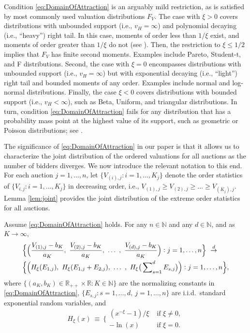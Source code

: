 Condition \eqref{eq:DomainOfAttraction} is an arguably mild restriction, as is satisfied by most commonly used valuation distributions $F_V$. The case with $\xi >0$ covers distributions with unbounded support (i.e., $v_H=\infty$) and polynomial decaying (i.e., ``heavy'') right tail. In this case, moments of order less than $1/\xi$ exist, and moments of order greater than $1/\xi$ do not (see \citet[page 176]{dehaan2006book}). Then, the restriction to $\xi \leq 1/2$ implies that $F_V$ has finite second moments. Examples include Pareto, Student-t, and F distributions. 
Second, the case with $\xi =0$ encompasses distributions with unbounded support (i.e., $v_H=\infty$) but with exponential decaying (i.e., ``light'') right tail and bounded moments of any order. Examples include normal and log-normal distributions. Finally, the case $\xi<0 $ covers distributions with bounded support (i.e., $v_H <\infty$), such as Beta, Uniform, and triangular distributions. In turn, condition \eqref{eq:DomainOfAttraction} fails for any distribution that has a probability mass point at the highest value of its support, such as geometric or Poisson distributions; see \citet[Exercise 1.13]{dehaan2006book}.

The significance of \eqref{eq:DomainOfAttraction} in our paper is that it allows us to characterize the joint distribution of the ordered valuations for all auctions as the number of bidders diverges. We now introduce the relevant notation to this end. For each auction $j=1,\dots,n$, let $\{V_{(i),j}:i=1,\dots,K_j\}$ denote the order statistics of $\{V_{i,j}:i=1,\dots,K_j\}$ in decreasing order, i.e., $V_{(1),j} \geq V_{(2),j}\geq \dots \geq V_{(K_j),j}$. Lemma \ref{lem:joint} provides the joint distribution of the extreme order statistics for all auctions.

\begin{lemma}\label{lem:joint}
Assume \eqref{eq:DomainOfAttraction} holds. For any $n \in \mathbb{N}$ and any $d \in \mathbb{N}$, and as $K\to \infty$,
\begin{align}
&\Big\{\Big( \frac{V_{(1),j} -b_{K}}{a_{K}}, ~\frac{V_{(2),j} -b_{K}}{a_{K}},~\dots~,~ \frac{V_{(d),j} -b_{K}}{a_{K}}\Big):j=1,\dots,n\Big\}~\overset{d}{\to}~\notag\\
&\Big\{\Big( H_{\xi}(E_{1,j}),~H_{\xi}(E_{1,j}+E_{2,j}),~\dots~,~H_{\xi}\big(\sum\nolimits_{s=1}^{d}E_{s,j}\big)\Big):j=1,\dots,n\Big\}, \label{eq:EVT}
\end{align}
where $\{(a_{K},b_{K}) \in \mathbb{R}_{++} \times \mathbb{R} :K \in \mathbb{N}\}$ are the normalizing constants in \eqref{eq:DomainOfAttraction},  $\{E_{s,j}:s=1,\dots,d,~j=1,\dots,n\}$ are i.i.d.\ standard exponential random variables, and
\begin{equation}
    H_{\xi}(x) ~\equiv~  \bigg\{ 
    \begin{array}{cc}
         ({x}^{-\xi} -1)/{\xi}&  \text{ if }\xi\neq 0,\\
         - \ln(x) &  \text{ if }\xi= 0.
    \end{array} 
    \label{eq:H_function}
\end{equation}
\end{lemma}

